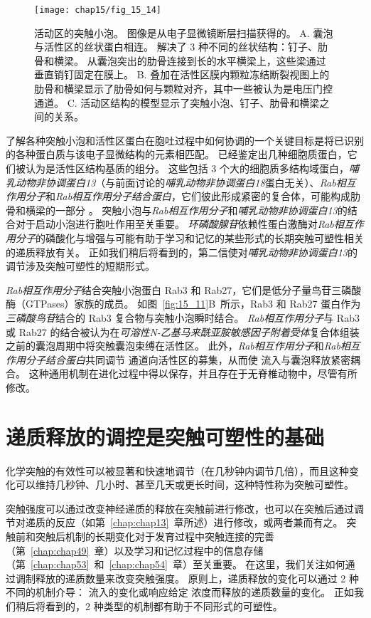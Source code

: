 \begin{figure}[htbp]
	\centering
	\texttt{[image: chap15/fig\_15\_14]}
	\caption{活动区的突触小泡。
		图像是从电子显微镜断层扫描获得的\cite{harlow2001architecture}。
		A. 囊泡与活性区的丝状蛋白相连。
		解决了 3 种不同的丝状结构：钉子、肋骨和横梁。
		从囊泡突出的肋骨连接到长的水平横梁上，这些梁通过垂直销钉固定在膜上。
		B. 叠加在活性区膜内颗粒冻结断裂视图上的肋骨和横梁显示了肋骨如何与颗粒对齐，其中一些被认为是电压门控通道。
		C. 活动区结构的模型显示了突触小泡、钉子、肋骨和横梁之间的关系。}
	\label{fig:15_14}
\end{figure}


了解各种突触小泡和活性区蛋白在胞吐过程中如何协调的一个关键目标是将已识别的各种蛋白质与该电子显微结构的元素相匹配。
已经鉴定出几种细胞质蛋白，它们被认为是活性区结构基质的组分。
这些包括 3 个大的细胞质多结构域蛋白，\textit{哺乳动物非协调蛋白13}（与前面讨论的\textit{哺乳动物非协调蛋白18}蛋白无关）、\textit{Rab相互作用分子}和\textit{Rab相互作用分子结合蛋白}，它们彼此形成紧密的复合体，可能构成肋骨和横梁的一部分 。
突触小泡与\textit{Rab相互作用分子}和\textit{哺乳动物非协调蛋白13}的结合对于启动小泡进行胞吐作用至关重要。
\textit{环磷酸腺苷}依赖性蛋白激酶对\textit{Rab相互作用分子}的磷酸化与增强与可能有助于学习和记忆的某些形式的长期突触可塑性相关的递质释放有关。
正如我们稍后将看到的，第二信使对\textit{哺乳动物非协调蛋白13}的调节涉及突触可塑性的短期形式。


\textit{Rab相互作用分子}结合突触小泡蛋白 Rab3 和 Rab27，它们是低分子量鸟苷三磷酸酶（GTPases）家族的成员。
如图~\ref{fig:15_11}B~所示，Rab3 和 Rab27 蛋白作为\textit{三磷酸鸟苷}结合的 Rab3 复合物与突触小泡瞬时结合。
\textit{Rab相互作用分子}与 Rab3 或 Rab27 的结合被认为在\textit{可溶性N-乙基马来酰亚胺敏感因子附着受体}复合体组装之前的囊泡周期中将突触囊泡束缚在活性区。
此外，\textit{Rab相互作用分子}和\textit{Rab相互作用分子结合蛋白}共同调节  通道向活性区的募集，从而使  流入与囊泡释放紧密耦合。
这种通用机制在进化过程中得以保存，并且存在于无脊椎动物中，尽管有所修改。



\section{递质释放的调控是突触可塑性的基础}

化学突触的有效性可以被显著和快速地调节（在几秒钟内调节几倍），而且这种变化可以维持几秒钟、几小时、甚至几天或更长时间，这种特性称为突触可塑性。


突触强度可以通过改变神经递质的释放在突触前进行修改，也可以在突触后通过调节对递质的反应（如第~\ref{chap:chap13}~章所述）进行修改，或两者兼而有之。
突触前和突触后机制的长期变化对于发育过程中突触连接的完善（第~\ref{chap:chap49}~章）以及学习和记忆过程中的信息存储（第~\ref{chap:chap53}~和~\ref{chap:chap54}~章）至关重要。
在这里，我们关注如何通过调制释放的递质数量来改变突触强度。
原则上，递质释放的变化可以通过 2 种不同的机制介导：
 流入的变化或响应给定  浓度而释放的递质数量的变化。
正如我们稍后将看到的，2 种类型的机制都有助于不同形式的可塑性。


